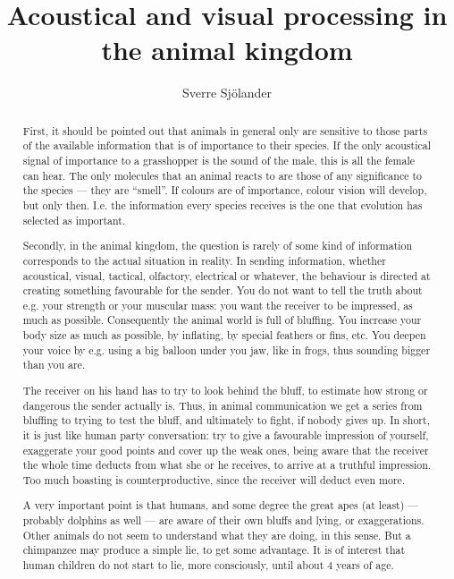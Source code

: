 \documentclass[a4paper]{article}
\title{Acoustical and visual processing in the animal kingdom}
\author{Sverre Sj{\"o}lander}
\begin{document}
\maketitle
%
\begin{abstract}
First, it should be pointed out that animals in general only are sensitive to those parts of the available information that is of importance to their species. If the only acoustical signal of importance to a grasshopper is the sound of the male, this is all the female can hear. The only molecules that an animal reacts to are those of any significance to the species --- they are ``smell''. If colours are of importance, colour vision will develop, but only then. I.e. the information every species receives is the one that evolution has selected as important.

Secondly, in the animal kingdom, the question is rarely of some kind of information corresponds to the actual situation in reality. In sending information, whether acoustical, visual, tactical, olfactory, electrical or whatever, the behaviour is directed at creating something favourable for the sender. You do not want to tell the truth about e.g. your strength or your muscular mass: you want the receiver to be impressed, as much as possible. Consequently the animal world is full of bluffing. You increase your body size as much as possible, by inflating, by special feathers or fins, etc. You deepen your voice by e.g. using a big balloon under you jaw, like in frogs, thus sounding bigger than you are.

The receiver on his hand has to try to look behind the bluff, to estimate how strong or dangerous the sender actually is. Thus, in animal communication we get a series from bluffing to trying to test the bluff, and ultimately to fight, if nobody gives up. In short, it is just like human party conversation: try to give a favourable impression of yourself, exaggerate your good points and cover up the weak ones, being aware that the receiver the whole time deducts from what she or he receives, to arrive at a truthful impression. Too much boasting is counterproductive, since the receiver will deduct even more.

A very important point is that humans, and some degree the great apes (at least) --- probably dolphins as well --- are aware of their own bluffs and lying, or exaggerations. Other animals do not seem to understand what they are doing, in this sense. But a chimpanzee may produce a simple lie, to get some advantage. It is of interest that human children do not start to lie, more consciously, until about 4 years of age.
\end{abstract}
\end{document}
